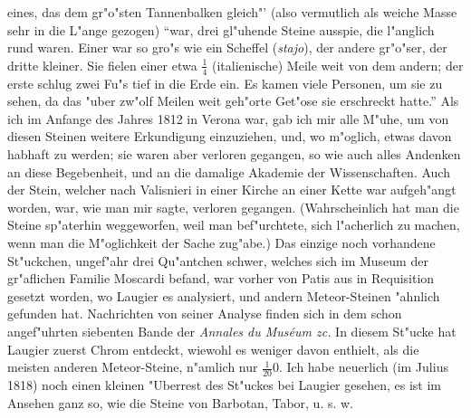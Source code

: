 \documentclass[a4paper, 11pt, oneside, polutonikogreek, german]{article}
\begin{document}
eines, das dem gr"o"sten Tannenbalken gleich"' (also vermutlich als weiche Masse sehr in die L"ange gezogen) "`war, drei gl"uhende Steine ausspie, die l"anglich rund waren. Einer war so gro"s wie ein Scheffel (\emph{stajo}), der andere gr"o"ser, der dritte kleiner. Sie fielen einer etwa $\mathfrak{\frac{1}{4}}$ (italienische) Meile weit von dem andern; der erste schlug zwei Fu"s tief in die Erde ein. Es kamen viele Personen, um sie zu sehen, da das "uber zw"olf Meilen weit geh"orte Get"ose sie erschreckt hatte."' Als ich im Anfange des Jahres 1812 in Verona war, gab ich mir alle M"uhe, um von diesen Steinen weitere Erkundigung einzuziehen, und, wo m"oglich, etwas davon habhaft zu werden; sie waren aber verloren gegangen, so wie auch alles Andenken an diese Begebenheit, und an die damalige Akademie der Wissenschaften. Auch der Stein, welcher nach Valisnieri in einer Kirche an einer Kette war aufgeh"angt worden, war, wie man mir sagte, verloren gegangen. (Wahrscheinlich hat man die Steine sp"aterhin weggeworfen, weil man bef"urchtete, sich l"acherlich zu machen, wenn man die M"oglichkeit der Sache zug"abe.) Das einzige noch vorhandene St"uckchen, ungef"ahr drei Qu"antchen schwer, welches sich im Museum der gr"aflichen Familie Moscardi befand, war vorher von Patis aus in Requisition gesetzt worden, wo Laugier es analysiert, und andern Meteor-Steinen "ahnlich gefunden hat. Nachrichten von seiner Analyse finden sich in dem schon angef"uhrten siebenten Bande der \emph{Annales du Muséum zc.} In diesem St"ucke hat Laugier zuerst Chrom entdeckt, wiewohl es weniger davon enthielt, als die meisten anderen Meteor-Steine, n"amlich nur $\mathfrak{\frac{1}{20}0}$. Ich habe neuerlich (im Julius 1818) noch einen kleinen "Uberrest des St"uckes bei Laugier gesehen, es ist im Ansehen ganz so, wie die Steine von Barbotan, Tabor, u. s. w.
\end{document}
